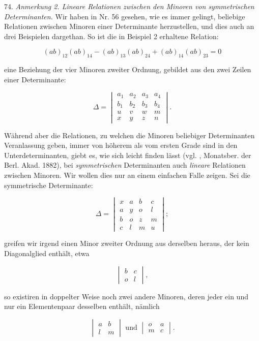 74. \textit{Anmerkung 2. Lineare Relationen zwischen den Minoren von symmetrischen Determinanten.} Wir haben in Nr. 56 gesehen, wie es immer gelingt, beliebige Relationen zwischen Minoren einer Determinante herzustellen, und dies auch an drei Beispielen dargethan. So ist die in Beispiel 2 erhaltene Relation:

\[
(ab)_{12}(ab)_{14} - (ab)_{13}(ab)_{24} + (ab)_{14}(ab)_{23} = 0
\]

eine Beziehung der vier Minoren zweiter Ordnung, gebildet aus den zwei Zeilen einer Determinante:

\[
\varDelta =
\begin{vmatrix}
a_1 & a_2 & a_3 & a_4\\
b_1 & b_2 & b_3 & b_4\\
u & v & w & m\\
x & y & z & n
\end{vmatrix}.
\]

Während aber die Relationen, zu welchen die Minoren beliebiger Determinanten Veranlassung geben, immer von höherem als vom ersten Grade sind in den Unterdeterminanten, giebt es, wie sich leicht finden lässt (vgl. , Monatsber. der Berl. Akad. 1882), bei \textit{symmetrischen} Determinanten auch \textit{lineare} Relationen zwischen Minoren. Wir wollen dies nur an einem einfachen Falle zeigen. Sei die symmetrische Determinante:

\[
\varDelta =
\begin{vmatrix}
x & a & b & c\\
a & y & o & l\\
b & o & z & m\\
c & l & m & u
\end{vmatrix};
\]



greifen wir irgend einen Minor zweiter Ordnung aus derselben heraus, der kein Diagonalglied enthält, etwa

\[
\begin{vmatrix} b & c\\ o & l\end{vmatrix},
\]

so existiren in doppelter Weise noch zwei andere Minoren, deren jeder ein und nur ein Elementenpaar desselben enthält, nämlich

\[
\begin{vmatrix} a & b\\ l & m\end{vmatrix} \text{ und } \begin{vmatrix} o & a\\ m & c\end{vmatrix}.
\]

